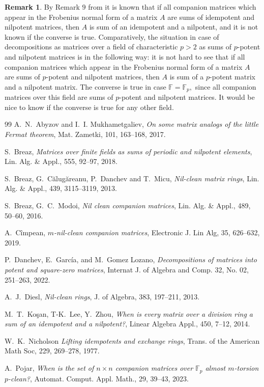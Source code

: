 \documentclass[11pt]{amsart}
\theoremstyle{definition}
\newtheorem{rem}[thm]{Remark}
\numberwithin{equation}{section}
\newcommand{\F}{\mathbb{F}}
\begin{document}
\begin{rem}
By Remark $9$ from \cite{BM} it is known that if all companion matrices which appear in the Frobenius normal form of a matrix $A$ are sums of idempotent and nilpotent matrices, then $A$ is sum of an idempotent and a nilpotent, and it is not known if the converse is true. Comparatively, the situation in case of decompositions as matrices over a field of characteristic $p>2$ as sums of $p$-potent and nilpotent matrices is in the following way: it is not hard to see that if all companion matrices which appear in the Frobenius normal form of a matrix $A$ are sums of $p$-potent and nilpotent matrices, then $A$ is sum of a $p$-potent matrix and a nilpotent matrix. The converse is true in case $\F=\F_p,$ since all companion matrices over this field are sums of $p$-potent and nilpotent matrices. It would be nice to know if the converse is true for any other field.
\end{rem}

\begin{thebibliography}{99}
A.~N.~Abyzov and I.~I. Mukhametgaliev, {\it On some matrix analogs of the little Fermat theorem}, Mat. Zametki, 101, 163--168, 2017.

S.~Breaz, {\it Matrices over finite fields as sums of periodic and nilpotent elements}, Lin. Alg. \& Appl., 555, 92--97, 2018.

S.~Breaz, G.~C\u{a}lug\u{a}reanu, P.~Danchev and T.~Micu, {\it Nil-clean matrix rings}, Lin. Alg. \& Appl., 439, 3115--3119, 2013.

S.~Breaz, G.~C.~Modoi, {\it Nil clean companion matrices}, Lin. Alg. \& Appl., 489, 50--60, 2016.

A.~C\^ impean, {\it $m$-nil-clean companion matrices}, Electronic J. Lin Alg, 35, 626--632, 2019.

P.~Danchev, E.~García, and M.~Gomez Lozano, {\it Decompositions of matrices into potent and square-zero matrices}, Internat J. of Algebra and Comp. 32, No. 02, 251--263, 2022.


A.~J.~Diesl, {\it Nil-clean rings}, J. of Algebra, 383, 197--211, 2013.

M.~T.~Ko\c san, T-K.~Lee, Y.~Zhou, {\it When is every matrix over a division ring a sum of an
idempotent and a nilpotent?}, Linear Algebra Appl., 450, 7--12, 2014.


W.~K.~Nicholson {\it Lifting idempotents and exchange rings}, Trans. of the American Math Soc, 229, 269--278, 1977.


A.~Pojar, {\it When is the set of $n\times n$ companion matrices over $\F_p$ almost $m$-torsion $p$-clean?}, Automat. Comput. Appl. Math., 29, 39--43, 2023.


\end{thebibliography}
\end{document}
